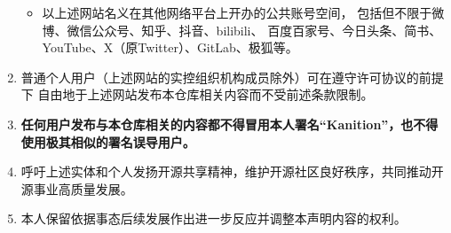 \begin{enumerate}
\begin{itemize}
                  \item 以上述网站名义在其他网络平台上开办的公共账号空间，
                        包括但不限于微博、微信公众号、知乎、抖音、bilibili、
                        百度百家号、今日头条、简书、YouTube、X（原Twitter）、GitLab、极狐等。
            \end{itemize}
      \item 普通个人用户（上述网站的实控组织机构成员除外）可在遵守许可协议的前提下
            自由地于上述网站发布本仓库相关内容而不受前述条款限制。
      \item {\bfseries 任何用户发布与本仓库相关的内容都不得冒用本人署名“Kanition”，也不得使用极其相似的署名误导用户。}
      \item 呼吁上述实体和个人发扬开源共享精神，维护开源社区良好秩序，共同推动开源事业高质量发展。
      \item 本人保留依据事态后续发展作出进一步反应并调整本声明内容的权利。
\end{enumerate}
